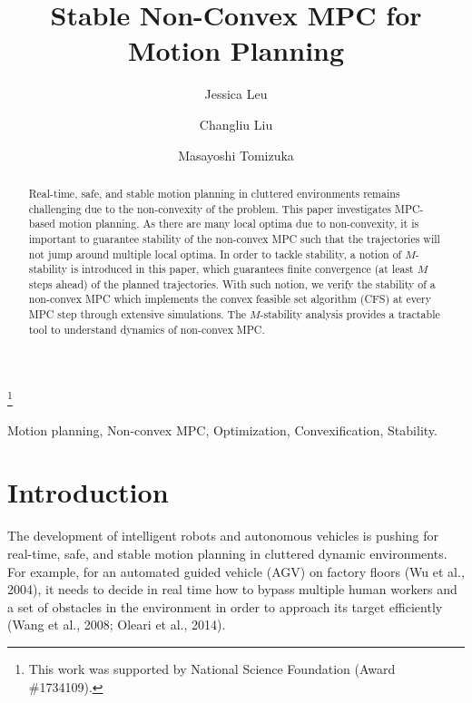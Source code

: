 \documentclass{ifacconf}
\begin{document}
\begin{frontmatter}

\title{Stable Non-Convex MPC for Motion Planning} 

\thanks[footnoteinfo]{This work was supported by National Science Foundation (Award \#1734109).}

\author[First]{ Jessica Leu} 
\author[Second]{ Changliu Liu} 
\author[First]{ Masayoshi Tomizuka}

\address[First]{ University of California,
Berkeley, CA 94720 USA\\ \tt jess.leu24, tomizuka@berkeley.edu}
\address[Second]{ Stanford University, CA 94305 USA\\ \tt  changliuliu@stanford.edu}


\begin{abstract}                %
Real-time, safe, and stable motion planning in cluttered environments remains challenging due to the non-convexity of the problem. This paper investigates MPC-based motion planning. As there are many local optima due to non-convexity, it is important to guarantee stability of the non-convex MPC such that the trajectories will not jump around multiple local optima. In order to tackle stability, a notion of $M$-stability is introduced in this paper, which guarantees finite convergence (at least $M$ steps ahead) of the planned trajectories. With such notion, we verify the stability of a non-convex MPC which implements the convex feasible set algorithm (CFS) at every MPC step through extensive simulations. The $M$-stability analysis provides a tractable tool to understand dynamics of non-convex MPC.
 

\end{abstract}

\begin{keyword}
Motion planning, Non-convex MPC, Optimization, Convexification, Stability.
\end{keyword}

\end{frontmatter}

\section{Introduction}
The development of intelligent robots and autonomous vehicles is pushing for real-time, safe, and stable motion planning in cluttered dynamic environments. For example, for an automated guided vehicle (AGV) on factory floors (Wu et al., 2004), it needs to decide in real time how to bypass multiple human workers and a set of obstacles in the environment in order to approach its target efficiently (Wang et al., 2008; Oleari et al., 2014). 
\end{document}
